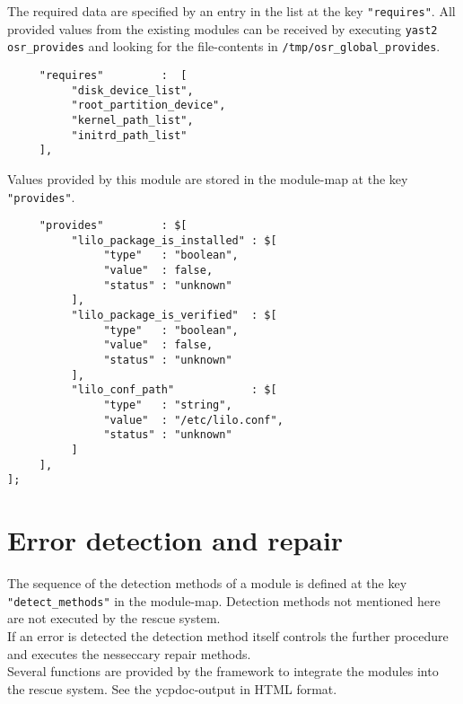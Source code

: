 The required data are specified by an entry in the list at the key
\verb+"requires"+. All provided values from the existing modules can be
received by executing \verb+yast2 osr_provides+ and looking for the
file-contents in \verb+/tmp/osr_global_provides+.

{\footnotesize \begin{verbatim}
     "requires"         :  [
          "disk_device_list",
          "root_partition_device",
          "kernel_path_list",
          "initrd_path_list"
     ],
\end{verbatim}}

Values provided by this module are stored in the module-map at the key
\verb+"provides"+.

{\footnotesize \begin{verbatim}
     "provides"         : $[
          "lilo_package_is_installed" : $[
               "type"   : "boolean",
               "value"  : false,
               "status" : "unknown"
          ],
          "lilo_package_is_verified"  : $[
               "type"   : "boolean",
               "value"  : false,
               "status" : "unknown"
          ],
          "lilo_conf_path"            : $[
               "type"   : "string",
               "value"  : "/etc/lilo.conf",
               "status" : "unknown"
          ]
     ],
];
\end{verbatim}}

\section{Error detection and repair}
The sequence of the detection methods of a module is defined 
at the key \verb+"detect_methods"+ in the module-map. Detection methods not
mentioned here are not executed by the rescue system.\\

If an error is detected the detection method itself controls the further
procedure and executes the nesseccary repair methods.\\

Several functions are provided by the framework to integrate the modules
into the rescue system. See the ycpdoc-output in HTML format.
